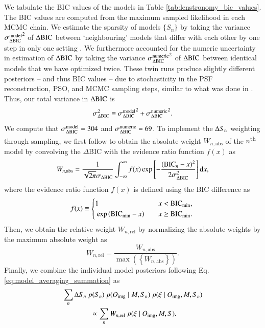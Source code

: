 \documentclass[longauth]{aa}
\newcommand{\ajs}[1]{{{#1}}}
\begin{document}
We tabulate the BIC values of the models in Table \ref{tab:lenstronomy_bic_values}. \ajs{The BIC values are computed from the maximum sampled likelihood in each MCMC chain.} We estimate the sparsity of models $\{S_n \}$ by taking the variance ${\sigma^{\rm model}_{\Delta {\rm BIC}}}^2$ of $\Delta {\rm BIC}$ between `neighbouring' models that differ with each other by one step in only one setting \citep{Shajib20}. We furthermore accounted for the numeric uncertainty in estimation of $\Delta {\rm BIC}$ by taking the variance ${\sigma^{\rm numeric}_{\Delta {\rm BIC}}}^2$ of $\Delta {\rm BIC}$ between identical models that we have optimized twice. These twin runs produce slightly different posteriors -- and thus BIC values -- due to stochasticity in the PSF reconstruction, PSO, and MCMC sampling steps, similar to what was done in \citet{Birrer19b}. Thus, our total variance in $\Delta {\rm BIC}$ is
%
\begin{equation}
        \sigma_{\Delta {\rm BIC}}^2 \equiv {\sigma^{\rm model}_{\Delta {\rm BIC}}}^2 + {\sigma^{\rm numeric}_{\Delta {\rm BIC}}}^2.
\end{equation}
%
We compute that ${\sigma^{\rm model}_{\Delta {\rm BIC}}} = 304$ and ${\sigma^{\rm numeric}_{\Delta {\rm BIC}}} = 69$. To implement the $\Delta S_{\rm n}$  weighting through sampling, we first follow \cite{Birrer19b} to obtain the absolute weight $W_{n, \text{abs}}$ of the $n$\textsuperscript{th} model by convolving the $\Delta$BIC with the evidence ratio function $f(x)$ as
%
\begin{equation} \label{eq:abs_model_weight}
        W_{n, \text{abs}} = \frac{1}{\sqrt{2 \pi} \sigma_{\Delta {\rm BIC}}} \int_{-\infty}^{\infty} f(x) \exp \left[-\frac{({\rm BIC}_n - x)^2}{2 \sigma_{\Delta {\rm BIC}}^2} \right] \mathrm{d} x,
\end{equation}
%
where the evidence ratio function $f(x)$ is defined using the BIC difference as
%
\begin{equation}
        f(x) \equiv 
     \begin{cases}
       1 &\quad x < {\rm BIC}_{\rm min}, \\\
       \exp\left( {\rm BIC}_{\rm min} - x \right) &\quad x \geq {\rm BIC}_{\rm min}. \
     \end{cases}
\end{equation}
% 
Then, we obtain the relative weight $W_{n, \text{rel}}$ by normalizing the absolute weights by the maximum absolute weight as
%
\begin{equation}
        W_{n, \text{rel}} = \frac{W_{n, \text{abs}}}{\max \left(\left\{ W_{n, \text{abs} } \right\} \right)}.
\end{equation}
%
Finally, we combine the individual model posteriors following Eq. \ref{eq:model_averaging_summation} as
%
\begin{equation}
\begin{split}
        &\sum_{n} \Delta S_n\ p(S_n) \ p(O_{\rm img} \mid M, S_n) \ p(\xi \mid O_{\rm img}, M, S_n) \\
        & \qquad \qquad \propto \sum_{n} W_{n, {\rm rel}}\ p(\xi \mid O_{\rm img}, M, S).
\end{split}
\end{equation}
% 
\end{document}
